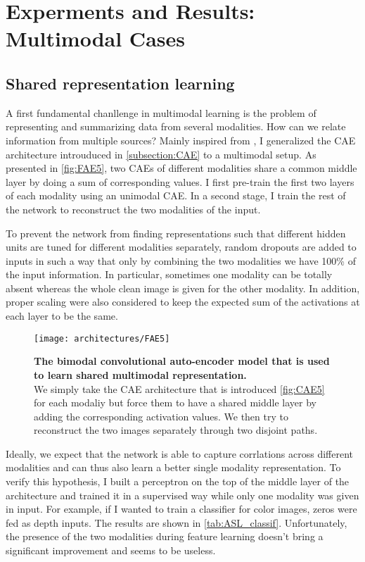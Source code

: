 \section{Experments and Results: Multimodal Cases} \label{section:multi}

\subsection{Shared representation learning} \label{subsection:shared}

A first fundamental chanllenge in multimodal learning is the problem
of representing and summarizing data from several modalities.
How can we relate information from multiple sources?
Mainly inspired from \cite{J. Ngiam 2011, A. Droniou 2014},
I generalized the CAE architecture introuduced in \ref{subsection:CAE}
to a multimodal setup. As presented in \autoref{fig:FAE5}, two CAEs
of different modalities share a common middle layer by doing a sum
of corresponding values. I first pre-train the first two layers
of each modality using an unimodal CAE. In a second stage, I train the
rest of the network to reconstruct the two modalities of the input.

To prevent the network from finding representations such that different
hidden units are tuned for different modalities separately, random
dropouts are added to inputs in such a way that only by combining the
two modalities we have 100\% of the input information. In particular,
sometimes one modality can be totally absent whereas the whole clean
image is given for the other modality. In addition, proper scaling were
also considered to keep the expected sum of the activations at each layer
to be the same.

\begin{figure}[H]
  \centering
  \texttt{[image: architectures/FAE5]}
  \caption{%
    \textbf{The bimodal convolutional auto-encoder model that is
      used to learn shared multimodal representation.}\\[0.1em]
    We simply take the CAE architecture that is introduced
      \autoref{fig:CAE5} for each modaliy but force them to have a
      shared middle layer by adding the corresponding activation values.
      We then try to reconstruct the two images separately through
      two disjoint paths.}
  \label{fig:FAE5}
\end{figure}

Ideally, we expect that the network is able to capture corrlations
across different modalities and can thus also learn a better single
modality representation. To verify this hypothesis, I built a perceptron
on the top of the middle layer of the architecture and trained it
in a supervised way while only one modality was given in input. For example,
if I wanted to train a classifier for color images, zeros were fed as
depth inputs. The results are shown in \autoref{tab:ASL_classif}.
Unfortunately, the presence of the two modalities during feature
learning doesn't bring a significant improvement and seems to be useless.

